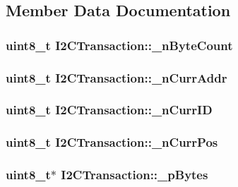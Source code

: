 \subsection{Member Data Documentation}
\hypertarget{class_i2_c_transaction_a24d497d1c5fd010ece230d977a0dd003}{
\subsubsection[{\_\-nByteCount}]{\setlength{\rightskip}{0pt plus 5cm}uint8\_\-t {\bf I2CTransaction::\_\-nByteCount}}}
\label{class_i2_c_transaction_a24d497d1c5fd010ece230d977a0dd003}
\hypertarget{class_i2_c_transaction_aa0ab915c4be9e95b5e2322c881512de6}{
\subsubsection[{\_\-nCurrAddr}]{\setlength{\rightskip}{0pt plus 5cm}uint8\_\-t {\bf I2CTransaction::\_\-nCurrAddr}}}
\label{class_i2_c_transaction_aa0ab915c4be9e95b5e2322c881512de6}
\hypertarget{class_i2_c_transaction_a64c7dc84f6e108ef1c2106a4c729c5fd}{
\subsubsection[{\_\-nCurrID}]{\setlength{\rightskip}{0pt plus 5cm}uint8\_\-t {\bf I2CTransaction::\_\-nCurrID}}}
\label{class_i2_c_transaction_a64c7dc84f6e108ef1c2106a4c729c5fd}
\hypertarget{class_i2_c_transaction_a952231ca793a8c72e879e44fd3fff4bc}{
\subsubsection[{\_\-nCurrPos}]{\setlength{\rightskip}{0pt plus 5cm}uint8\_\-t {\bf I2CTransaction::\_\-nCurrPos}}}
\label{class_i2_c_transaction_a952231ca793a8c72e879e44fd3fff4bc}
\hypertarget{class_i2_c_transaction_a3c04420a4def944e055fd66b262a51c7}{
\subsubsection[{\_\-pBytes}]{\setlength{\rightskip}{0pt plus 5cm}uint8\_\-t$\ast$ {\bf I2CTransaction::\_\-pBytes}}}
